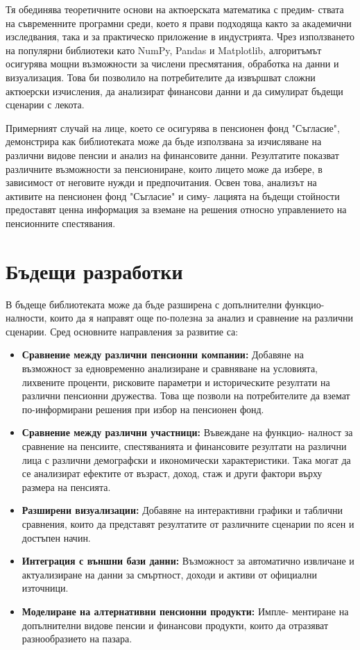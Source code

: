 \documentclass[a4paper,12pt]{article}
\begin{document}
Тя обединява теоретичните основи на актюерската математика с предим- ствата на съвременните програмни среди, което я прави подходяща както за академични изследвания, така и за практическо приложение в индустрията. Чрез използването на популярни библиотеки като NumPy, Pandas и Matplotlib, алгоритъмът осигурява мощни възможности за числени пресмятания, обработка на данни и визуализация. Това би позволило на потребителите да извършват сложни актюерски изчисления, да анализират финансови данни и да симулират бъдещи сценарии с лекота.

Примерният случай на лице, което се осигурява в пенсионен фонд "Съгласие", демонстрира как библиотеката може да бъде използвана за изчисляване на различни видове пенсии и анализ на финансовите данни. Резултатите показват различните възможности за пенсиониране, които лицето може да избере, в зависимост от неговите нужди и предпочитания. Освен това, анализът на активите на пенсионен фонд "Съгласие" и симу- лацията на бъдещи стойности предоставят ценна информация за вземане на решения относно управлението на пенсионните спестявания.

\section{Бъдещи разработки}
В бъдеще библиотеката може да бъде разширена с допълнителни функцио- налности, които да я направят още по-полезна за анализ и сравнение на различни сценарии. Сред основните направления за развитие са:

\begin{itemize}
        \item \textbf{Сравнение между различни пенсионни компании:} Добавяне на възможност за едновременно анализиране и сравняване на условията, лихвените проценти, рисковите параметри и историческите резултати на различни пенсионни дружества. Това ще позволи на потребителите да вземат по-информирани решения при избор на пенсионен фонд.
        \item \textbf{Сравнение между различни участници:} Въвеждане на функцио- налност за сравнение на пенсиите, спестяванията и финансовите резултати на различни лица с различни демографски и икономически характеристики. Така могат да се анализират ефектите от възраст, доход, стаж и други фактори върху размера на пенсията.
        \item \textbf{Разширени визуализации:} Добавяне на интерактивни графики и таблични сравнения, които да представят резултатите от различните сценарии по ясен и достъпен начин.
        \item \textbf{Интеграция с външни бази данни:} Възможност за автоматично извличане и актуализиране на данни за смъртност, доходи и активи от официални източници.
        \item \textbf{Моделиране на алтернативни пенсионни продукти:} Импле- ментиране на допълнителни видове пенсии и финансови продукти, които да отразяват разнообразието на пазара.
\end{itemize}
\end{document}
